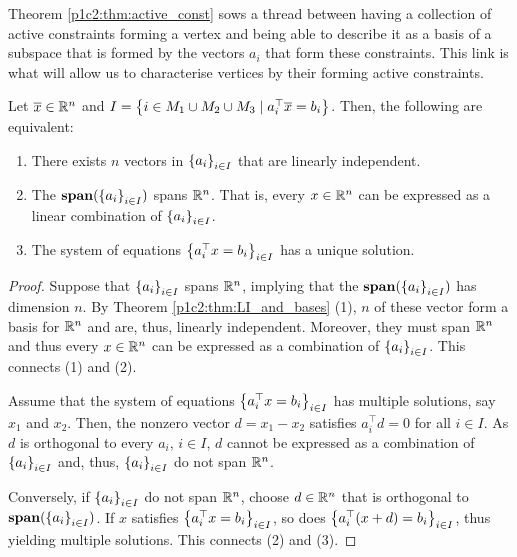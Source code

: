 Theorem \ref{p1c2:thm:active_const} sows a thread between having a collection of active constraints forming a vertex and being able to describe it as a basis of a subspace that is formed by the vectors $a_i$ that form these constraints. This link is what will allow us to characterise vertices by their forming active constraints.

\begin{theorem}\label{p1c2:thm:active_const}
	Let $\overline{x} \in \mathbb{R}^n$ and $I = \left\{  i \in M_1 \cup M_2 \cup M_3 \mid a_i^\top \overline{x} = b_i \right \}$. Then, the following are equivalent:
	\begin{enumerate}
		\item There exists $n$ vectors in $\left\{ a_i \right \}_{i \in I}$ that are linearly independent.  
		\item The $\mathop{\bf span}(\left\{ a_i \right \}_{i \in I})$ spans $\mathbb{R}^n$. That is, every $x \in \mathbb{R}^n$ can be expressed as a linear combination of $\left\{ a_i \right \}_{i \in I}$.
		\item The system of equations $\left\{ a_i ^\top x = b_i \right \}_{i \in I}$ has a unique solution.
	\end{enumerate}
\end{theorem}

\begin{proof}
	Suppose that $\left\{ a_i \right \}_{i \in I}$ spans $\mathbb{R}^n$, implying that the $\mathop{\bf span}(\left\{ a_i \right \}_{i \in I})$ has dimension $n$. By Theorem \ref{p1c2:thm:LI_and_bases} (1), $n$ of these vector form a basis for $\mathbb{R}^n$ and are, thus, linearly independent. Moreover, they must span $\mathbb{R}^n$ and thus every $x \in \mathbb{R}^n$ can be expressed as a combination of $\left\{ a_i \right \}_{i \in I}$. This connects (1) and (2).
	
	Assume that the system of equations $\left\{ a_i ^\top x = b_i \right \}_{i \in I}$ has multiple solutions, say $x_1$ and $x_2$. Then, the nonzero vector $d = x_1 - x_2$ satisfies $a_i^\top d = 0$ for all $i \in I$. As $d$ is orthogonal to every $a_i$, $i \in I$, $d$ cannot be expressed as a combination of $\left\{ a_i \right \}_{i \in I}$ and, thus, $\left\{ a_i \right \}_{i \in I}$ do not span $\mathbb{R}^n$.
	
	Conversely, if $\left\{ a_i \right \}_{i \in I}$ do not span $\mathbb{R}^n$, choose $d \in \mathbb{R}^n$ that is orthogonal to $\mathop{\bf span}(\left\{ a_i \right \}_{i \in I})$. If $x$ satisfies $\left\{ a_i ^\top x = b_i \right \}_{i \in I}$, so does $\left\{ a_i ^\top (x + d) = b_i \right \}_{i \in I}$, thus yielding multiple solutions. This connects (2) and (3). \qedhere
\end{proof}

